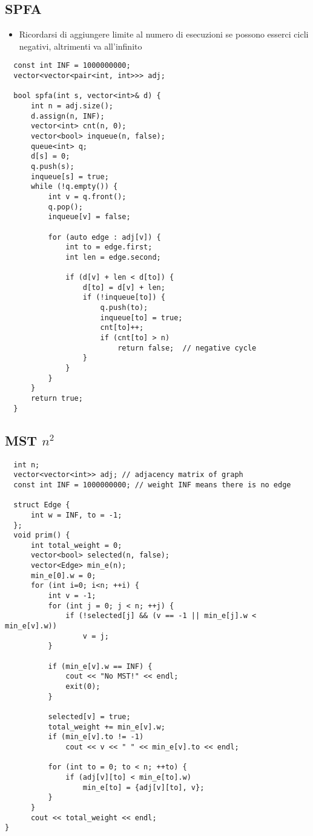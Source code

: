 \subsection{SPFA}
\begin{itemize}
    \item Ricordarsi di aggiungere limite al numero di esecuzioni se possono esserci cicli negativi, altrimenti va all'infinito
\end{itemize}
\begin{lstlisting}
  const int INF = 1000000000;
  vector<vector<pair<int, int>>> adj;

  bool spfa(int s, vector<int>& d) {
      int n = adj.size();
      d.assign(n, INF);
      vector<int> cnt(n, 0);
      vector<bool> inqueue(n, false);
      queue<int> q;
      d[s] = 0;
      q.push(s);
      inqueue[s] = true;
      while (!q.empty()) {
          int v = q.front();
          q.pop();
          inqueue[v] = false;

          for (auto edge : adj[v]) {
              int to = edge.first;
              int len = edge.second;

              if (d[v] + len < d[to]) {
                  d[to] = d[v] + len;
                  if (!inqueue[to]) {
                      q.push(to);
                      inqueue[to] = true;
                      cnt[to]++;
                      if (cnt[to] > n)
                          return false;  // negative cycle
                  }
              }
          }
      }
      return true;
  }
\end{lstlisting}

\subsection{MST $n^2$}
\begin{lstlisting}
  int n;
  vector<vector<int>> adj; // adjacency matrix of graph
  const int INF = 1000000000; // weight INF means there is no edge

  struct Edge {
      int w = INF, to = -1;
  };
  void prim() {
      int total_weight = 0;
      vector<bool> selected(n, false);
      vector<Edge> min_e(n);
      min_e[0].w = 0;
      for (int i=0; i<n; ++i) {
          int v = -1;
          for (int j = 0; j < n; ++j) {
              if (!selected[j] && (v == -1 || min_e[j].w < min_e[v].w))
                  v = j;
          }

          if (min_e[v].w == INF) {
              cout << "No MST!" << endl;
              exit(0);
          }

          selected[v] = true;
          total_weight += min_e[v].w;
          if (min_e[v].to != -1)
              cout << v << " " << min_e[v].to << endl;

          for (int to = 0; to < n; ++to) {
              if (adj[v][to] < min_e[to].w)
                  min_e[to] = {adj[v][to], v};
          }
      }
      cout << total_weight << endl;
}
\end{lstlisting}

